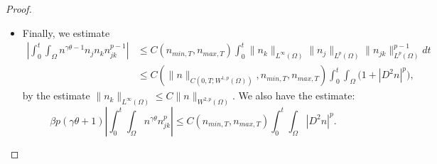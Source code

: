 \documentclass[12pt]{article}
\theoremstyle{plain}
\begin{document}
\begin{proof}
\begin{itemize}
\begin{equation*}
    \end{equation*}
    Hence, we can estimate:
    \begin{align*}
    \Bigg|\sum_{i = 1}^{d} \int_{0}^{t} \int_{\Omega} &\Big(n_{ij}n_{jk}^{p - 1}W_{ik} + n_{ik}n_{jk}^{p - 1}W_{ij} + n_{i}n_{jk}^{p - 1}W_{ijk} + n_{j}n_{jk}^{p - 1}W_{iik} + n_{k}n_{jk}^{p - 1}W_{iij}\Big)\Bigg| \\
    &\le C_{p}\left(\int_{0}^{t} \int_{\Omega} |\nabla n|^{p} |D^{3}W|^{p} + \int_{0}^{t} \left(\int_{\Omega} |D^{2}n|^{p}\right)\Big(1 +  \|W\|_{L^{\infty}(0, T; W^{2, \infty}(\Omega))}^{p}\Big)\right) \\
    &\le C_{p} \left(\int_{0}^{t} \|\nabla n\|_{L^{\infty}(\Omega)}^{p} \|W\|_{W^{3, p}(\Omega)}^{p} + \int_{0}^{t} \left(\int_{\Omega} |D^{2}n|^{p}\right) \Big(1 + \|W\|_{L^{\infty}(0, T; W^{2, \infty}(\Omega)}^{p}\Big)\right) \\
    &\le C(p, \|n\|_{C(0, T; W^{1, p}(\Omega))}, n_{min, T}, n_{max, T})\int_{0}^{t} \int_{\Omega} \Big(1 + |D^{2}n|^{p}\Big),
    \end{align*}
    since $\|\nabla n\|_{L^{\infty}} \le C_p \|n\|_{W^{2, p}(\Omega)}$ and $W \in C(0, T; W^{3, p}(\Omega)) \subset C(0, T; W^{2, \infty}(\Omega))$ with $$\|W\|_{C(0, T; W^{3, p}(\Omega))} \le C(p, n_{max, T})\|n\|_{C(0, T; W^{1, p}(\Omega))}.$$
    \item Finally, we estimate
    \begin{align*}
    \left|\int_{0}^{t} \int_{\Omega} n^{\gamma \theta - 1} n_{j}n_{k} n_{jk}^{p - 1}\right| &\le C(n_{min, T}, n_{max, T}) \int_{0}^{t} \|n_{k}\|_{L^{\infty}(\Omega)} \|n_{j}\|_{L^{p}(\Omega)} \|n_{jk}\|_{L^{p}(\Omega)}^{p - 1} dt \\
    &\le C(\|n\|_{C(0, T; W^{1, p}(\Omega))}, n_{min, T}, n_{max, T}) \int_{0}^{t} \int_{\Omega} \Big(1 + |D^{2}n|^{p}\Big),
    \end{align*}
    by the estimate $\|n_{k}\|_{L^{\infty}(\Omega)} \le C\|n\|_{W^{2, p}(\Omega)}$. We also have the estimate:
    \begin{equation*}
    \beta p (\gamma \theta + 1) \left|\int_{0}^{t} \int_{\Omega} n^{\gamma \theta} n_{jk}^{p}\right| \le C(n_{min, T}, n_{max, T}) \int_{0}^{t} \int_{\Omega} |D^{2}n|^{p}.
    \end{equation*}
\end{itemize}


\end{proof}
\end{document}

